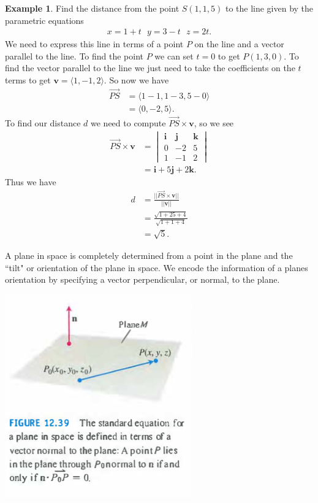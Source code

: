 \documentclass[12pt, letter]{article}
\theoremstyle{plain}
\numberwithin{theorem}{section}
\theoremstyle{definition}
\newtheorem{example}[theorem]{Example}
\begin{document}
\begin{example}
Find the distance from the point $S(1,1,5)$ to the line given by the parametric equations
\begin{align*}
x=1+t \ \ \ y=3-t \ \ \ z=2t.
\end{align*}
We need to express this line in terms of a point $P$ on the line and a vector parallel to the line. To find the point $P$ we can set $t=0$ to get $P(1,3,0)$. To find the vector parallel to the line we just need to take the coefficients on the $t$ terms to get $\bm{v} = \langle 1, -1, 2 \rangle$. So now we have
\begin{align*}
\vec{PS} &= \langle 1-1, 1-3, 5-0 \rangle\\
&= \langle 0, -2, 5 \rangle.
\end{align*}
To find our distance $d$ we need to compute $\vec{PS} \times \bm{v}$, so we see
\begin{align*}
\vec{PS} \times \bm{v} &= \begin{vmatrix} \bm{i} & \bm{j} & \bm{k} \\ 0 & -2 & 5 \\ 1 & -1 & 2 \end{vmatrix}\\
&= \bm{i} + 5\bm{j} + 2\bm{k}.
\end{align*}
Thus we have
\begin{align*}
d &= \frac{||\vec{PS} \times \bm{v}||}{||\bm{v}||}\\
&= \frac{\sqrt{1+25+4}}{\sqrt{1+1+4}}\\
&= \sqrt{5}.
\end{align*}
\end{example}

\bigskip

\hrulefill

\bigskip

A plane in space is completely determined from a point in the plane and the ``tilt" or orientation of the plane in space. We encode the information of a planes orientation by specifying a vector perpendicular, or normal, to the plane.

\bigskip

\begin{center}
\includegraphics[scale=0.7]{m1_f19}
\end{center}
\end{document}
